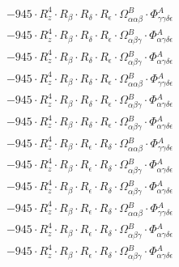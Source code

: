 \documentclass{article}
\begin{document}
\begin{subequations}
\begin{gather}
\begin{array}{c}
 \\[0.2em] 		 - 945 \cdot R_{z}^{4} \cdot R_{\beta{}} \cdot R_{\delta{}} \cdot R_{\epsilon{}} \cdot \Omega{}^{B}_{\alpha{}\alpha{}\beta{}} \cdot \Phi{}^{A}_{\gamma{}\gamma{}\delta{}\epsilon{}} 
 \\[0.2em] 		 - 945 \cdot R_{z}^{4} \cdot R_{\beta{}} \cdot R_{\delta{}} \cdot R_{\epsilon{}} \cdot \Omega{}^{B}_{\alpha{}\beta{}\gamma{}} \cdot \Phi{}^{A}_{\alpha{}\gamma{}\delta{}\epsilon{}} 
 \\[0.2em] 		 - 945 \cdot R_{z}^{4} \cdot R_{\beta{}} \cdot R_{\delta{}} \cdot R_{\epsilon{}} \cdot \Omega{}^{B}_{\alpha{}\beta{}\gamma{}} \cdot \Phi{}^{A}_{\alpha{}\gamma{}\delta{}\epsilon{}} 
 \\[0.2em] 		 - 945 \cdot R_{z}^{4} \cdot R_{\beta{}} \cdot R_{\delta{}} \cdot R_{\epsilon{}} \cdot \Omega{}^{B}_{\alpha{}\alpha{}\beta{}} \cdot \Phi{}^{A}_{\gamma{}\gamma{}\delta{}\epsilon{}} 
 \\[0.2em] 		 - 945 \cdot R_{z}^{4} \cdot R_{\beta{}} \cdot R_{\delta{}} \cdot R_{\epsilon{}} \cdot \Omega{}^{B}_{\alpha{}\beta{}\gamma{}} \cdot \Phi{}^{A}_{\alpha{}\gamma{}\delta{}\epsilon{}} 
 \\[0.2em] 		 - 945 \cdot R_{z}^{4} \cdot R_{\beta{}} \cdot R_{\delta{}} \cdot R_{\epsilon{}} \cdot \Omega{}^{B}_{\alpha{}\beta{}\gamma{}} \cdot \Phi{}^{A}_{\alpha{}\gamma{}\delta{}\epsilon{}} 
 \\[0.2em] 		 - 945 \cdot R_{z}^{4} \cdot R_{\beta{}} \cdot R_{\epsilon{}} \cdot R_{\delta{}} \cdot \Omega{}^{B}_{\alpha{}\alpha{}\beta{}} \cdot \Phi{}^{A}_{\gamma{}\gamma{}\delta{}\epsilon{}} 
 \\[0.2em] 		 - 945 \cdot R_{z}^{4} \cdot R_{\beta{}} \cdot R_{\epsilon{}} \cdot R_{\delta{}} \cdot \Omega{}^{B}_{\alpha{}\beta{}\gamma{}} \cdot \Phi{}^{A}_{\alpha{}\gamma{}\delta{}\epsilon{}} 
 \\[0.2em] 		 - 945 \cdot R_{z}^{4} \cdot R_{\beta{}} \cdot R_{\epsilon{}} \cdot R_{\delta{}} \cdot \Omega{}^{B}_{\alpha{}\beta{}\gamma{}} \cdot \Phi{}^{A}_{\alpha{}\gamma{}\delta{}\epsilon{}} 
 \\[0.2em] 		 - 945 \cdot R_{z}^{4} \cdot R_{\beta{}} \cdot R_{\epsilon{}} \cdot R_{\delta{}} \cdot \Omega{}^{B}_{\alpha{}\alpha{}\beta{}} \cdot \Phi{}^{A}_{\gamma{}\gamma{}\delta{}\epsilon{}} 
 \\[0.2em] 		 - 945 \cdot R_{z}^{4} \cdot R_{\beta{}} \cdot R_{\epsilon{}} \cdot R_{\delta{}} \cdot \Omega{}^{B}_{\alpha{}\beta{}\gamma{}} \cdot \Phi{}^{A}_{\alpha{}\gamma{}\delta{}\epsilon{}} 
 \\[0.2em] 		 - 945 \cdot R_{z}^{4} \cdot R_{\beta{}} \cdot R_{\epsilon{}} \cdot R_{\delta{}} \cdot \Omega{}^{B}_{\alpha{}\beta{}\gamma{}} \cdot \Phi{}^{A}_{\alpha{}\gamma{}\delta{}\epsilon{}} 

\end{array}
\end{gather}
\end{subequations}
\end{document}
